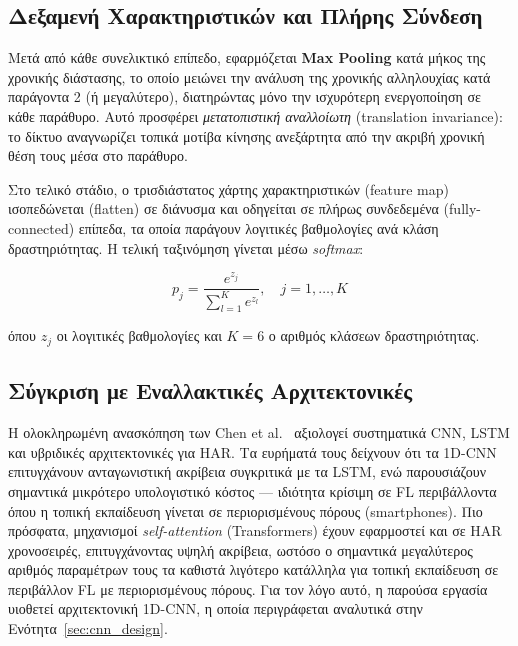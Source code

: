 \subsection{Δεξαμενή Χαρακτηριστικών και Πλήρης Σύνδεση}
\label{subsec:pooling_fc}

Μετά από κάθε συνελικτικό επίπεδο, εφαρμόζεται \textbf{Max Pooling}
κατά μήκος της χρονικής διάστασης, το οποίο μειώνει την ανάλυση της
χρονικής αλληλουχίας κατά παράγοντα 2 (ή μεγαλύτερο), διατηρώντας
μόνο την ισχυρότερη ενεργοποίηση σε κάθε παράθυρο. Αυτό προσφέρει
\textit{μετατοπιστική αναλλοίωτη} (translation invariance): το δίκτυο
αναγνωρίζει τοπικά μοτίβα κίνησης ανεξάρτητα από την ακριβή χρονική
θέση τους μέσα στο παράθυρο.

Στο τελικό στάδιο, ο τρισδιάστατος χάρτης χαρακτηριστικών (feature map)
ισοπεδώνεται (flatten) σε διάνυσμα και οδηγείται σε πλήρως συνδεδεμένα
(fully-connected) επίπεδα, τα οποία παράγουν λογιτικές βαθμολογίες
ανά κλάση δραστηριότητας. Η τελική ταξινόμηση γίνεται μέσω \textit{softmax}:

\begin{equation}
    \label{eq:softmax}
    p_j = \frac{e^{z_j}}{\sum_{l=1}^{K} e^{z_l}}, \quad j = 1,\ldots,K
\end{equation}

\noindent όπου $z_j$ οι λογιτικές βαθμολογίες και $K = 6$ ο αριθμός
κλάσεων δραστηριότητας.

\subsection{Σύγκριση με Εναλλακτικές Αρχιτεκτονικές}
\label{subsec:architecture_comparison}

Η ολοκληρωμένη ανασκόπηση των Chen et al.\ \cite{Chen2021} αξιολογεί
συστηματικά CNN, LSTM και υβριδικές αρχιτεκτονικές για HAR. Τα
ευρήματά τους δείχνουν ότι τα 1D-CNN επιτυγχάνουν ανταγωνιστική ακρίβεια
συγκριτικά με τα LSTM, ενώ παρουσιάζουν σημαντικά μικρότερο υπολογιστικό
κόστος — ιδιότητα κρίσιμη σε FL περιβάλλοντα όπου η τοπική εκπαίδευση
γίνεται σε περιορισμένους πόρους (smartphones). Πιο πρόσφατα, μηχανισμοί
\textit{self-attention} (Transformers) \cite{Vaswani2017} έχουν εφαρμοστεί
και σε HAR χρονοσειρές, επιτυγχάνοντας υψηλή ακρίβεια, ωστόσο ο
σημαντικά μεγαλύτερος αριθμός παραμέτρων τους τα καθιστά λιγότερο
κατάλληλα για τοπική εκπαίδευση σε περιβάλλον FL με περιορισμένους πόρους.
Για τον λόγο αυτό, η παρούσα εργασία υιοθετεί αρχιτεκτονική 1D-CNN, η
οποία περιγράφεται αναλυτικά στην Ενότητα~\ref{sec:cnn_design}.
